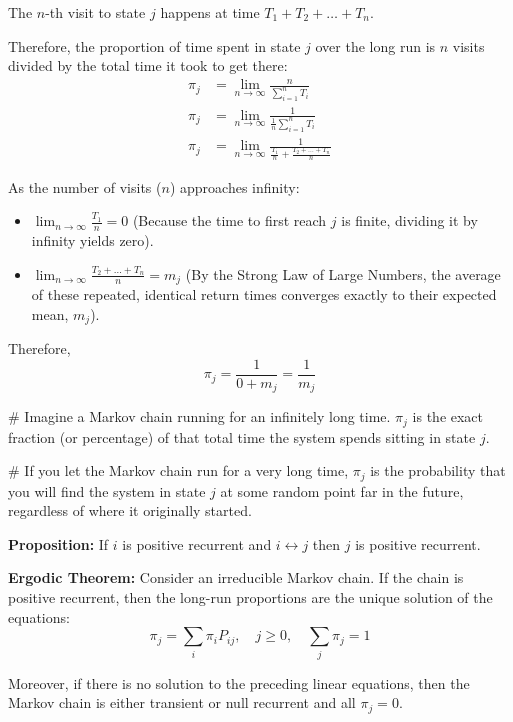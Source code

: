 The $n$-th visit to state $j$ happens at time $T_1 + T_2 + \dots + T_n$.

Therefore, the proportion of time spent in state $j$ over the long run is $n$ visits divided by the total time it took to get there:
\begin{align*}
    \pi_j &= \lim_{n \to \infty} \frac{n}{\sum_{i=1}^n T_i} \\
    \pi_j &= \lim_{n \to \infty} \frac{1}{\frac{1}{n} \sum_{i=1}^n T_i} \\
    \pi_j &= \lim_{n \to \infty} \frac{1}{\frac{T_1}{n} + \frac{T_2 + \dots + T_n}{n}}
\end{align*}

As the number of visits ($n$) approaches infinity:
\begin{itemize}
    \item $\lim_{n \to \infty} \frac{T_1}{n} = 0$ (Because the time to first reach $j$ is finite, dividing it by infinity yields zero).
    \item $\lim_{n \to \infty} \frac{T_2 + \dots + T_n}{n} = m_j$ (By the Strong Law of Large Numbers, the average of these repeated, identical return times converges exactly to their expected mean, $m_j$).
\end{itemize}

Therefore,
\[ \pi_j = \frac{1}{0 + m_j} = \frac{1}{m_j} \]

\# Imagine a Markov chain running for an infinitely long time. $\pi_j$ is the exact fraction (or percentage) of that total time the system spends sitting in state $j$.

\# If you let the Markov chain run for a very long time, $\pi_j$ is the probability that you will find the system in state $j$ at some random point far in the future, regardless of where it originally started.

\textbf{Proposition:} If $i$ is positive recurrent and $i \leftrightarrow j$ then $j$ is positive recurrent.

\textbf{Ergodic Theorem:} Consider an irreducible Markov chain. If the chain is positive recurrent, then the long-run proportions are the unique solution of the equations:
\[ \pi_j = \sum_i \pi_i P_{ij}, \quad j \ge 0, \quad \sum_j \pi_j = 1 \]

Moreover, if there is no solution to the preceding linear equations, then the Markov chain is either transient or null recurrent and all $\pi_j = 0$.

\vspace{0.5cm}
\vspace{0.5cm}


